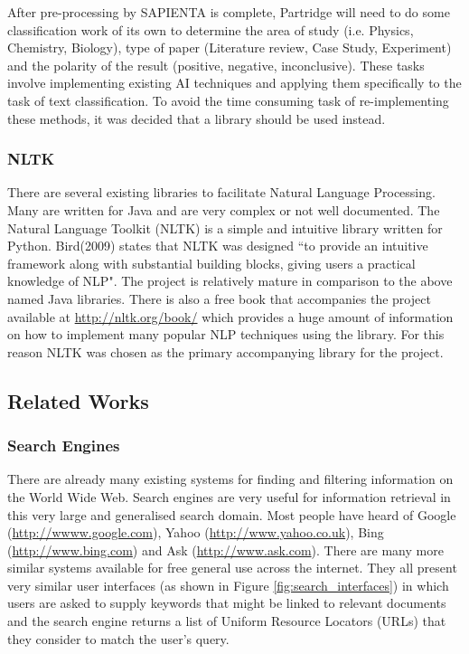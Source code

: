 \documentclass[12pt,a4paper]{article}
\begin{document}
After pre-processing by SAPIENTA is complete, Partridge will need to do some
classification work of its own to determine the area of study (i.e. Physics,
Chemistry, Biology), type of paper (Literature review, Case Study, Experiment)
and the polarity of the result (positive, negative, inconclusive). These tasks
involve implementing existing AI techniques and applying them specifically to
the task of text classification. To avoid the time consuming task of re-implementing these
methods, it was decided that a library should be used instead. 

\subsubsection{NLTK}

There are several existing libraries to facilitate Natural Language Processing.
Many are written for Java \cite{mallet2002}\cite{cunningham2011text} and are
very complex or not well documented. The Natural Language Toolkit (NLTK) is a
simple and intuitive library written for Python. Bird(2009) states that NLTK
was designed ``to provide an intuitive framework along with substantial
building blocks, giving users a practical knowledge of NLP". The project is
relatively mature in comparison to the above named Java libraries. There is
also a free book that accompanies the project available at
\url{http://nltk.org/book/} which provides a huge amount of information on how
to implement many popular NLP techniques using the library. For this reason
NLTK was chosen as the primary accompanying library for the project.

\subsection{Related Works}
\label{sec:prior_art}

\subsubsection{Search Engines}
There are already many existing systems for finding and filtering information
on the World Wide Web. Search engines are very useful for information retrieval
in this very large and generalised search domain. Most people have heard of
Google (\url{http://wwww.google.com}), Yahoo (\url{http://www.yahoo.co.uk}),
Bing (\url{http://www.bing.com}) and Ask (\url{http://www.ask.com}). There are
many more similar systems available for free general use across the internet.
They all present very similar user interfaces (as shown in Figure
\ref{fig:search_interfaces}) in which users are asked to supply keywords that
might be linked to relevant documents and the search engine returns a list of
Uniform Resource Locators (URLs) that they consider to match the user's query.
\end{document}
